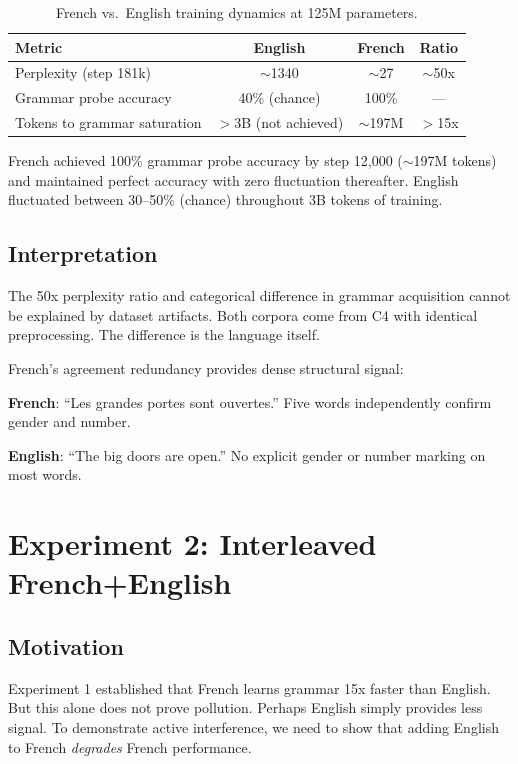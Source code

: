 \documentclass[11pt,a4paper]{article}
\begin{document}
\begin{table}[h]
\centering
\begin{tabular}{lccc}
\toprule
Metric & English & French & Ratio \\
\midrule
Perplexity (step 181k) & $\sim$1340 & $\sim$27 & $\sim$50x \\
Grammar probe accuracy & 40\% (chance) & 100\% & --- \\
Tokens to grammar saturation & $>$3B (not achieved) & $\sim$197M & $>$15x \\
\bottomrule
\end{tabular}
\caption{French vs.\ English training dynamics at 125M parameters.}
\end{table}

French achieved 100\% grammar probe accuracy by step 12,000 ($\sim$197M tokens) and maintained perfect accuracy with zero fluctuation thereafter. English fluctuated between 30--50\% (chance) throughout 3B tokens of training.

\subsection{Interpretation}

The 50x perplexity ratio and categorical difference in grammar acquisition cannot be explained by dataset artifacts. Both corpora come from C4 with identical preprocessing. The difference is the language itself.

French's agreement redundancy provides dense structural signal:

\textbf{French}: ``Les grandes portes sont ouvertes.'' Five words independently confirm gender and number.

\textbf{English}: ``The big doors are open.'' No explicit gender or number marking on most words.

\section{Experiment 2: Interleaved French+English}

\subsection{Motivation}

Experiment 1 established that French learns grammar 15x faster than English. But this alone does not prove pollution. Perhaps English simply provides less signal. To demonstrate active interference, we need to show that adding English to French \emph{degrades} French performance.
\end{document}

